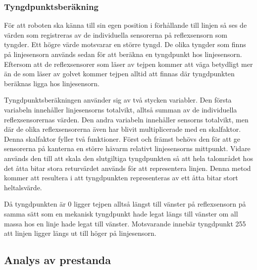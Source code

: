 \subsubsection{Tyngdpunktsberäkning}
För att roboten ska känna till sin egen position i förhållande till linjen så ses de värden som registreras av de individuella sensorerna på reflexsensorn som tyngder. Ett högre värde motsvarar en större tyngd. De olika tyngder som finns på linjesensorn används sedan för att beräkna en tyngdpunkt hos linjesensorn. Eftersom att de reflexsensorer som läser av tejpen kommer att väga betydligt mer än de som läser av golvet kommer tejpen alltid att finnas där tyngdpunkten beräknas ligga hos linjesensorn.

Tyngdpunktsberäkningen använder sig av två stycken variabler. Den första variabeln innehåller linjesensorns totalvikt, alltså summan av de individuella reflexsensorernas värden. Den andra variabeln innehåller sensorns totalvikt, men där de olika reflexsensorerna även har blivit multiplicerade med en skalfaktor. Denna skalfaktor fyller två funktioner. Först och främst behövs den för att ge sensorerna på kanterna en större hävarm relativt linjesensorns mittpunkt. Vidare används den till att skala den slutgiltiga tyngdpunkten så att hela talområdet hos det åtta bitar stora returvärdet används för att representera linjen. Denna metod kommer att resultera i att tyngdpunkten representeras av ett åtta bitar stort heltalsvärde.

Då tyngdpunkten är 0 ligger tejpen alltså längst till vänster på reflexsensorn på samma sätt som en mekanisk tyngdpunkt hade legat längs till vänster om all massa hos en linje hade legat till vänster. Motsvarande innebär tyngdpunkt 255 att linjen ligger längs ut till höger på linjesensorn.

\subsection{Analys av prestanda}








